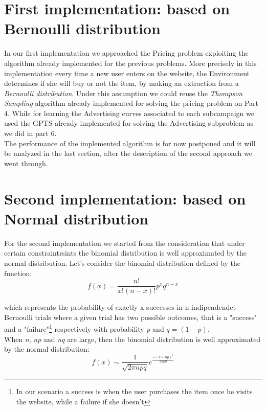 \section{First implementation: based on Bernoulli distribution}
In our first implementation we approached the Pricing problem exploiting the algorithm already implemented for the previous problems. More precisely in this implementation every time a new user enters on the website, the Environment determines if she will buy or not the item, by making an extraction from a \textit{Bernoulli distribution}. Under this assumption we could reuse the \textit{Thompson Sampling} algorithm already implemented for solving the pricing problem on Part 4.
While for learning the Advertising curves associated to each subcampaign we used the GPTS already implemented for solving the Advertising subproblem as we did in part 6.\\ The performance of the implemented algorithm is for now postponed and it will be analyzed in the last section, after the description of the second approach we went through.


\section{Second implementation: based on Normal distribution}
For the second implementation we started from the consideration that under certain constraintrsints the binomial distribution is well approximated by the normal distribution. Let's consider the binomial distribution defined by the function:
\begin{equation}
    f(x) = \frac{n!}{x!(n-x)!}  p^x q^{n-x} 
\end{equation}

which represents the probability of exactly x successes in n indipendendet Bernoulli trials where a given trial has two possible outcomes, that is a "success" and a "failure"\footnote{In our scenario a success is when the user purchases the item once he visits the website, while a failure if she doesn't} respectively with probability \textit{p} and $q=(1-p)$.\\ When \textit{n}, \textit{np} and \textit{nq} are large, then the binomial distribution is well approximated by the normal distribution:
\begin{equation}
    f(x)  \sim \frac{1}{\sqrt{2 \pi npq}} e^{ \frac{-(x-np)^2}{2npq} }
\end{equation}

